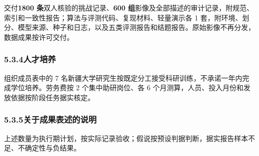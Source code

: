 交付\textbf{1800 条}双人核验的挑战记录、\textbf{600 组}影像及全部描述的审计记录，附规范、索引和一致性报告；算法与评测代码、复现材料、轻量演示各 1 套，附环境、划分、模型来源、种子和日志，以及五类评测报告和结题报告。原始影像不再分发，数据成果按许可交付。

\subsubsection*{5.3.4\quad 人才培养}

组织成员表中的 7 名新疆大学研究生按既定分工接受科研训练，不承诺一年内完成学位培养。劳务费按 2 个集中助研岗位、各 6 个月测算，人员、投入月份和发放依据按阶段任务据实核定。

\subsubsection*{5.3.5\quad 关于成果表述的说明}

上述数量为执行期计划，按实际记录验收；假说按预设判据判断，据实报告样本不足、不确定性与负结果。
